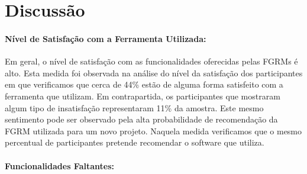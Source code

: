 \begin{table}[htpb]
\centering
{}
\caption{Classificação das funcionalidades que possam dar suporte ao uso das
metodologias dos agilistas.}\label{tab:melhorias_fgrm_suporte_particas_ageis}
\end{table}

\section{Discussão}

\paragraph{Nível de Satisfação com a Ferramenta Utilizada:}\label{par:pesq_profissionais_nivel_de_satisfação}

Em geral, o nível de satisfação com as funcionalidades oferecidas pelas FGRMs é
alto. Esta medida foi observada na análise do nível da satisfação dos
participantes em que verificamos que cerca de 44\% estão de alguma forma
satisfeito com a ferramenta que utilizam. Em contrapartida, os participantes
que mostraram algum tipo de insatisfação representaram 11\% da amostra. Este
mesmo sentimento pode ser observado pela alta probabilidade de recomendação da
FGRM utilizada para um novo projeto. Naquela medida verificamos que o mesmo
percentual de participantes pretende recomendar o software que utiliza.

\paragraph{Funcionalidades Faltantes:}\label{par:pesq_profissionais_funcionalidades_faltantes}

